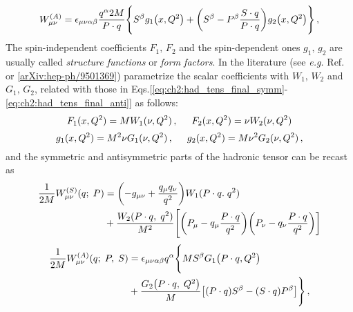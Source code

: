 \begin{equation}
  \begin{split}
    W_{\mu \nu}^{(A)}  =  \epsilon_{\mu \nu \alpha \beta} \frac{q^{\alpha}2 M}{P \cdot q} \Biggl\{S^{\beta} g_1 \qty(x, Q^2) + \qty(S^{\beta} - P^{\beta} \frac{S \cdot q}{P \cdot q}) g_2 \qty(x,Q^2) \Biggr\} \,,
    \label{eq:ch2:had_tens_final_anti}
  \end{split}
\end{equation}
The spin-independent coefficients $F_1,\, F_2$ and the spin-dependent ones $g_1,\,g_2$ are usually called \textit{structure functions} or \textit{form factors}. In the literature (see \textit{e.g.} Ref. \cite{leader_2001} or [\href{https://arxiv.org/abs/hep-ph/9501369}{arXiv:hep-ph/9501369}]) parametrize the scalar coefficients with $W_1 ,\, W_2$ and $G_1,\, G_2$, related with those in Eqs.[\ref{eq:ch2:had_tens_final_symm}-\ref{eq:ch2:had_tens_final_anti}] as follows:
\begin{equation}
  F_1 (x, Q^2) = M W_1 (\nu, Q^2)\,, \hspace{5mm} F_2(x,Q^2) = \nu W_2 (\nu,Q^2)
\end{equation}
\begin{equation}
  g_1 (x, Q^2) = M^2 \nu G_1 (\nu, Q^2) \,, \hspace{5mm} g_2 (x, Q^2) = M \nu^2 G_2 (\nu, Q^2)\,,
\end{equation}
and the symmetric and antisymmetric parts of the hadronic tensor can be recast as
\begin{equation}
  \begin{split}
    \frac{1}{2M} W_{\mu \nu}^{(S)} (q; \; P) & = \qty(-g_{\mu \nu} + \frac{q_{\mu} q_{\nu}}{q^2}) W_1( P \cdot q. \; q^2) \\
    & + \frac{W_2 (P\cdot q,\; q^2)}{M^2} \Biggl[ \qty(P_{\mu} - q_{\mu} \frac{P \cdot q}{q^2}) \qty(P_{\nu} - q_{\nu} \frac{P \cdot q}{q^2}) \biggr]
  \end{split}
  \label{eq:ch2:had_tens_symm}
\end{equation}
\begin{equation}
  \begin{split}
    \frac{1}{2M} W_{\mu \nu}^{(A)} (q; \; P, \; S) & = \epsilon_{\mu \nu \alpha \beta} q^{\alpha} \Biggl\{ M S^{\beta} G_1 \qty(P\cdot q, Q^2) \Biggr.\\
    & +  \Biggl. \frac{G_2 \qty(P \cdot q,\;Q^2)}{M} \qty[ (P \cdot q) S^{\beta} - (S \cdot q) P^{\beta} ]\Biggr\} \,,
  \end{split}  
\end{equation}
